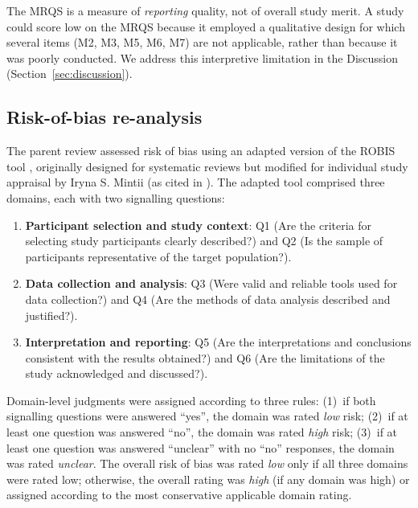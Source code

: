 \documentclass[etq]{acnsart}
\begin{document}
	The MRQS is a measure of \emph{reporting} quality, not of overall study merit. A study could score low on the MRQS because it employed a qualitative design for which several items (M2, M3, M5, M6, M7) are not applicable, rather than because it was poorly conducted. We address this interpretive limitation in the Discussion (Section~\ref{sec:discussion}).
	
	\subsection{Risk-of-bias re-analysis}
	\label{sec:methods_rob}
	
	The parent review assessed risk of bias using an adapted version of the ROBIS tool \cite{Whiting2016}, originally designed for systematic reviews but modified for individual study appraisal by Iryna S. Mintii (as cited in \cite{KorniienkoSemerikov2024}). The adapted tool comprised three domains, each with two signalling questions:
	
	\begin{enumerate}[label=\textbf{Domain~\arabic*~--}, leftmargin=*]%
		\item \textbf{Participant selection and study context}: Q1 (Are the criteria for selecting study participants clearly described?) and Q2 (Is the sample of participants representative of the target population?).
		\item \textbf{Data collection and analysis}: Q3 (Were valid and reliable tools used for data collection?) and Q4 (Are the methods of data analysis described and justified?).
		\item \textbf{Interpretation and reporting}: Q5 (Are the interpretations and conclusions consistent with the results obtained?) and Q6 (Are the limitations of the study acknowledged and discussed?).
	\end{enumerate}
	
	Domain-level judgments were assigned according to three rules: (1)~if both signalling questions were answered ``yes'', the domain was rated \emph{low} risk; (2)~if at least one question was answered ``no'', the domain was rated \emph{high} risk; (3)~if at least one question was answered ``unclear'' with no ``no'' responses, the domain was rated \emph{unclear}. The overall risk of bias was rated \emph{low} only if all three domains were rated low; otherwise, the overall rating was \emph{high} (if any domain was high) or assigned according to the most conservative applicable domain rating.
	
\end{document}
